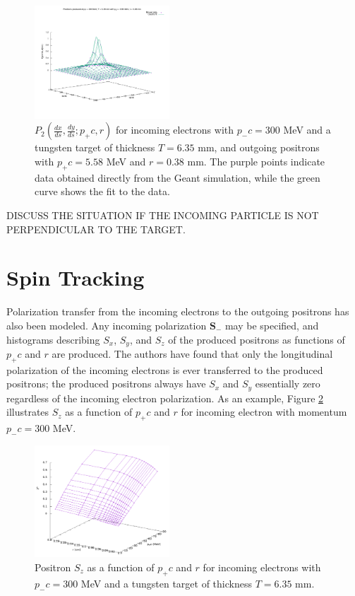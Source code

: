 \documentclass[letter,
               biblatex,     %
               keeplastbox,   %
               ]{jacow}
\newcommand{\dxds}{\frac{dx}{ds}}
\newcommand{\dyds}{\frac{dy}{ds}}
\begin{document}
\begin{figure}
\centering
\includegraphics[width=0.45\textwidth]{p2}
\caption{$P_2 \left( \dxds, \dyds ; p_+ c, r \right)$ for incoming electrons with $p_- c = 300$ MeV and a tungsten target of thickness $T = 6.35$ mm,
and outgoing positrons with $p_+ c = 5.58$ MeV and $r = 0.38$ mm.
The purple points indicate data obtained directly from the Geant simulation, while the green curve shows the fit to the data.
}
\label{fig:p2}
\end{figure}

%

DISCUSS THE SITUATION IF THE INCOMING PARTICLE IS NOT PERPENDICULAR TO THE TARGET.


\section{Spin Tracking}

Polarization transfer from the incoming electrons to the outgoing positrons has also been modeled.
Any incoming polarization $\mathbf{S}_-$ may be specified, and histograms describing $S_x$, $S_y$, and $S_z$ of the produced positrons as functions of $p_+ c$ and $r$ are produced.
The authors have found that only the longitudinal polarization of the incoming electrons is ever transferred to the produced positrons; the produced positrons always have $S_x$ and $S_y$ essentially zero regardless of the incoming electron polarization.
As an example, Figure \ref{fig:sz} illustrates $S_z$ as a function of $p_+ c$ and $r$ for incoming electron with momentum $p_- c = 300$ MeV.

\begin{figure}
\centering
\includegraphics[width=0.45\textwidth]{sz}
\caption{Positron $S_z$ as a function of $p_+ c$ and $r$ for incoming electrons with $p_- c = 300$ MeV and a tungsten target of thickness $T = 6.35$ mm.}
\label{fig:sz}
\end{figure}
\end{document}
